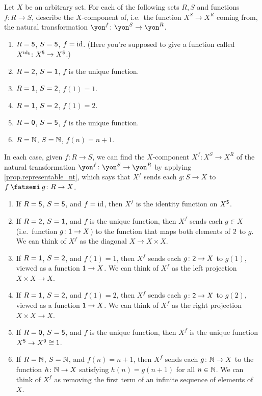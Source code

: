 \documentclass[Book-Poly]{subfiles}
\begin{document}
\begin{exercise} \label{exc.representable_nt_components}
Let $X$ be an arbitrary set. For each of the following sets $R,S$ and functions $f\colon R\to S$, describe the $X$-component of, i.e.\ the function $X^S\to X^R$ coming from, the natural transformation $\yon^f\colon\yon^S\to\yon^R$.
\begin{enumerate}
	\item \label{exc.representable_nt_components.id} $R=\textsf{5}$, $S=\textsf{5}$, $f=\mathrm{id}$.  (Here you're supposed to give a function called $X^{\mathrm{id}_{\textsf{5}}}\colon X^{\textsf{5}}\to X^{\textsf{5}}$.)
	\item $R=\textsf{2}$, $S=\textsf{1}$, $f$ is the unique function.
	\item $R=\textsf{1}$, $S=\textsf{2}$, $f(1)=1$.
	\item $R=\textsf{1}$, $S=\textsf{2}$, $f(1)=2$.
	\item $R=\textsf{0}$, $S=\textsf{5}$, $f$ is the unique function.
	\item $R=\mathbb{N}$, $S=\mathbb{N}$, $f(n)=n+1$.
\qedhere
\end{enumerate}

\begin{solution}
In each case, given $f \colon R \to S$, we can find the $X$-component $X^f \colon X^S \to X^R$ of the natural transformation $\yon^f\colon\yon^S\to\yon^R$ by applying \cref{prop.representable_nt}, which says that $X^f$ sends each $g \colon S \to X$ to $f \then g \colon R \to X$.
\begin{enumerate}
    \item If $R=\textsf{5}$, $S=\textsf{5}$, and $f=\mathrm{id}$, then $X^f$ is the identity function on $X^{\textsf{5}}$.
    \item If $R=\textsf{2}$, $S=\textsf{1}$, and $f$ is the unique function, then $X^f$ sends each $g \in X$ (i.e.\ function $g \colon \textsf{1} \to X$) to the function that maps both elements of $\textsf{2}$ to $g$.
    We can think of $X^f$ as the diagonal $X \to X \times X$.
	\item If $R=\textsf{1}$, $S=\textsf{2}$, and $f(1)=1$, then $X^f$ sends each $g \colon \textsf{2} \to X$ to $g(1)$, viewed as a function $\textsf{1} \to X$.
	We can think of $X^f$ as the left projection $X \times X \to X$.
	\item If $R=\textsf{1}$, $S=\textsf{2}$, and $f(1)=2$, then $X^f$ sends each $g \colon \textsf{2} \to X$ to $g(2)$, viewed as a function $\textsf{1} \to X$.
	We can think of $X^f$ as the right projection $X \times X \to X$.
	\item If $R=\textsf{0}$, $S=\textsf{5}$, and $f$ is the unique function, then $X^f$ is the unique function $X^{\textsf{5}} \to X^{\textsf{0}} \cong \textsf{1}$.
	\item If $R=\mathbb{N}$, $S=\mathbb{N}$, and $f(n)=n+1$, then $X^f$ sends each $g \colon \mathbb{N} \to X$ to the function $h \colon \mathbb{N} \to X$ satisfying $h(n) = g(n+1)$ for all $n \in \mathbb{N}$.
	We can think of $X^f$ as removing the first term of an infinite sequence of elements of $X$.
\end{enumerate}
\end{solution}
\end{exercise}
\end{document}
